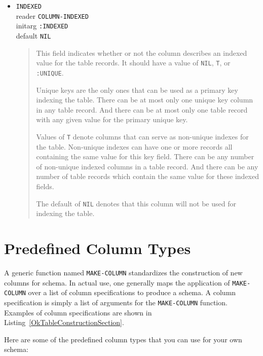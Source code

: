 \documentclass[article,oneside]{memoir}
\begin{document}
\begin{itemize}
\pagebreak[4]
\item \texttt{INDEXED} \\ 
reader \texttt{COLUMN-INDEXED} \\ 
initarg \texttt{:INDEXED} \\ 
default \texttt{NIL}

\begin{quote}
This field indicates whether or not the column describes an indexed value for the table records. It should have a value of \texttt{NIL}, \texttt{T}, or \texttt{:UNIQUE}. 

Unique keys are the only ones that can be used as a primary key indexing the table. There can be at most only one unique key column in any table record. And there can be at most only one table record with any given value for the primary unique key.

Values of \texttt{T} denote columns that can serve as non-unique indexes for the table. Non-unique indexes can have one or more records all containing the same value for this key field. There can be any number of non-unique indexed columns in a table record. And there can be any number of table records which contain the same value for these indexed fields.

The default of \texttt{NIL} denotes that this column will not be used for indexing the table.
\end{quote}

\end{itemize}

\section{Predefined Column Types}
\label{PredefinedColumnTypes}
A generic function named \texttt{MAKE-COLUMN} standardizes the construction of new columns for schema. In actual use, one generally maps the application of \texttt{MAKE-COLUMN} over a list of column specifications to produce a schema. A column specification is simply a list of arguments for the \texttt{MAKE-COLUMN} function. Examples of column specifications are shown in Listing~\ref{OkTableConstructionSection}.

Here are some of the predefined column types that you can use for your own schema:
\end{document}
